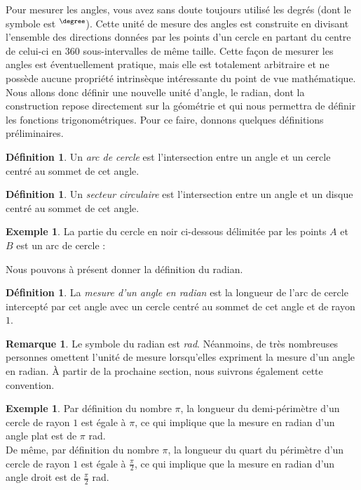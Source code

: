 \documentclass[a4paper,fontsize=13pt]{scrreprt}
\theoremstyle{plain}
\theoremstyle{definition}
\newtheorem{déf}[subsection]{Définition}
\newtheorem{exe}[subsection]{Exemple}
\newtheorem{rema}[subsection]{Remarque}
\begin{document}
Pour mesurer les angles, vous avez sans doute toujours utilisé les degrés (dont le symbole est ${}^{\degree}$). Cette unité de mesure des angles est construite en divisant l'ensemble des directions données par les points d'un cercle en partant du centre de celui-ci en $360$ sous-intervalles de même taille. Cette façon de mesurer les angles est éventuellement pratique, mais elle est totalement arbitraire et ne possède aucune propriété intrinsèque intéressante du point de vue mathématique. Nous allons donc définir une nouvelle unité d'angle, le radian, dont la construction repose directement sur la géométrie et qui nous permettra de définir les fonctions trigonométriques. Pour ce faire, donnons quelques définitions préliminaires.
\begin{déf}
Un \emph{arc de cercle} est l'intersection entre un angle et un cercle centré au sommet de cet angle.
\end{déf}
\begin{déf}
Un \emph{secteur circulaire} est l'intersection entre un angle et un disque centré au sommet de cet angle.
\end{déf}
\begin{exe}
La partie du cercle en noir ci-dessous délimitée par les points $A$ et $B$ est un arc de cercle :
\begin{center}
\end{center}
\end{exe}
Nous pouvons à présent donner la définition du radian.
\begin{déf}
La \emph{mesure d'un angle en radian} est la longueur de l'arc de cercle intercepté par cet angle avec un cercle centré au sommet de cet angle et de rayon $1$.
\end{déf}
\begin{rema}
Le symbole du radian est \textit{rad}. Néanmoins, de très nombreuses personnes omettent l'unité de mesure lorsqu'elles expriment la mesure d'un angle en radian. \`A partir de la prochaine section, nous suivrons également cette convention.
\end{rema}
\begin{exe}
Par définition du nombre $\pi$, la longueur du demi-périmètre d'un cercle de rayon $1$ est égale à $\pi$, ce qui implique que la mesure en radian d'un angle plat est de $\pi $ rad. \\
De même, par définition du nombre $\pi$, la longueur du quart du périmètre d'un cercle de rayon $1$ est égale à $\frac{\pi}{2}$, ce qui implique que la mesure en radian d'un angle droit est de $\frac{\pi}{2}$ rad.
\end{exe}
\end{document}
